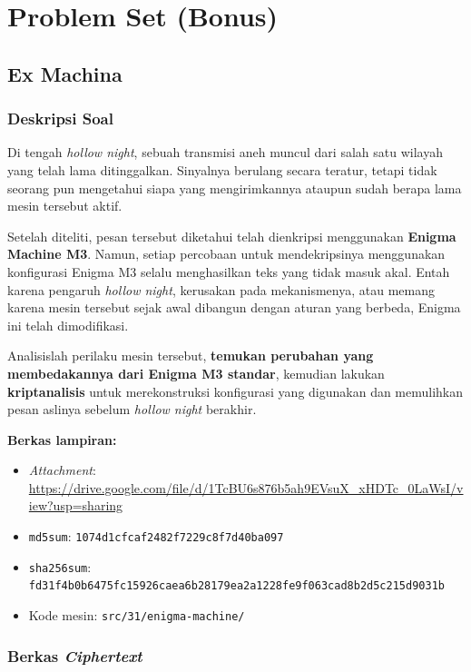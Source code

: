 \chapter{Problem Set (Bonus)}

\section{Ex Machina}

\subsection*{Deskripsi Soal}

Di tengah \textit{hollow night}, sebuah transmisi aneh muncul dari salah satu
wilayah yang telah lama ditinggalkan. Sinyalnya berulang secara teratur, tetapi
tidak seorang pun mengetahui siapa yang mengirimkannya ataupun sudah berapa lama
mesin tersebut aktif.

Setelah diteliti, pesan tersebut diketahui telah dienkripsi menggunakan
\textbf{Enigma Machine M3}. Namun, setiap percobaan untuk mendekripsinya
menggunakan konfigurasi Enigma M3 selalu menghasilkan teks yang tidak masuk
akal. Entah karena pengaruh \textit{hollow night}, kerusakan pada mekanismenya,
atau memang karena mesin tersebut sejak awal dibangun dengan aturan yang
berbeda, Enigma ini telah dimodifikasi.

Analisislah perilaku mesin tersebut, \textbf{temukan perubahan yang
membedakannya dari Enigma M3 standar}, kemudian lakukan \textbf{kriptanalisis}
untuk merekonstruksi konfigurasi yang digunakan dan memulihkan pesan aslinya
sebelum \textit{hollow night} berakhir.

\medskip
\noindent\textbf{Berkas lampiran:}
\begin{itemize}[nosep]
  \item \textit{Attachment}: \url{https://drive.google.com/file/d/1TcBU6s876b5ah9EVsuX_xHDTc_0LaWsI/view?usp=sharing}
  \item \texttt{md5sum}: \texttt{1074d1cfcaf2482f7229c8f7d40ba097}
  \item \texttt{sha256sum}: \texttt{fd31f4b0b6475fc15926caea6b28179ea2a1228fe9f063cad8b2d5c215d9031b}
  \item Kode mesin: \texttt{src/31/enigma-machine/}
\end{itemize}

\subsection*{Berkas \textit{Ciphertext}}

